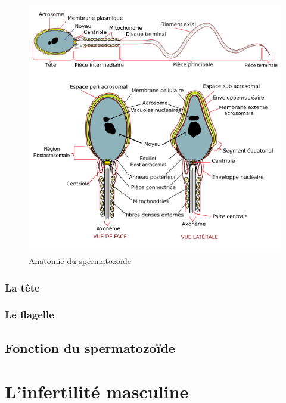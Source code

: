 \documentclass[12pt,twoside]{reedthesis}
\theoremstyle{definition}
\theoremstyle{definition}
\theoremstyle{remark}
\begin{document}
  \begin{figure}
  
  {\centering \includegraphics[scale=0.7]{figure/spermatozoide} 
  
  }
  
  \caption{Anatomie du spermatozoïde}\label{fig:spermatozoïde}
  \end{figure}
  
  \subsubsection{La tête}\label{la-tete}
  
  \subsubsection{Le flagelle}\label{le-flagelle}
  
  \subsection{Fonction du spermatozoïde}\label{fonction-du-spermatozoide}
  
  \section{L'infertilité masculine}\label{linfertilite-masculine}
  
\end{document}

